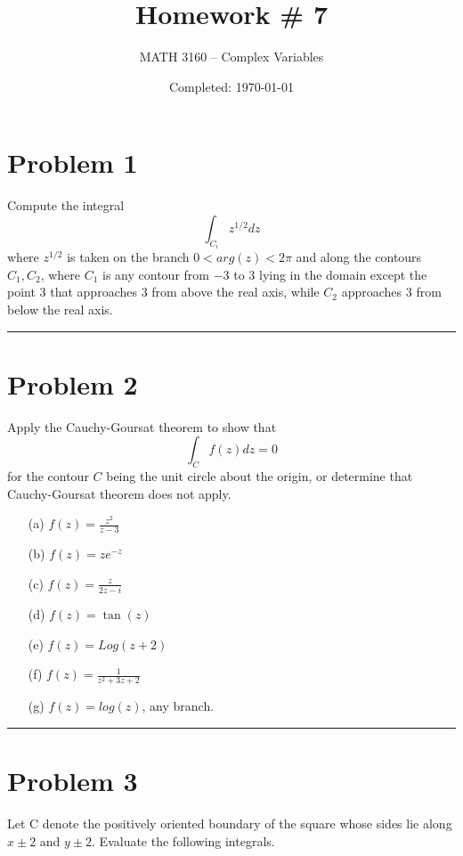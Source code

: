\documentclass{article}
\title{Homework \# 7}
\author{
  MATH 3160 -- Complex Variables\\
  \myauthor
}
\date{Completed: \today}
\begin{document}
\maketitle %


\section*{Problem 1}
Compute the integral \[ \int_{C_i} z^{1/2} dz\] where $ z^{1/2} $ is taken on the branch $0<arg(z)<2\pi$ and along the contours $C_1 , C_2$,  where $C_1$ is any contour from $-3$ to $3$ lying in the domain except the point $3$ that approaches $3$ from above the real axis, while $C_2$ approaches $3$ from below the real axis.
               
\vspace{.5cm} %

\hrule %

\newpage
\section*{Problem 2}
Apply the Cauchy-Goursat theorem to show that \[  \int_C f(z)dz = 0\] for the contour $C$ being the unit circle about the origin, or determine that Cauchy-Goursat theorem does not apply.

\begin{enumerate}
\item[(a)] $f(z) = \frac{z^2}{z-3}$
\item[(b)] $f(z) = ze^{-z}$
\item[(c)] $f(z) = \frac{z}{2z-i}$ 
\item[(d)] $f(z) = \tan(z)$
\item[(e)] $f(z) = Log(z+2)$ 
\item[(f)] $f(z) = \frac{1}{z^2+3z+2}$
\item[(g)] $f(z) = log(z)$, any branch.
\end{enumerate}
		
\vspace{.5cm} %

\hrule

\newpage
\section*{Problem 3}
 Let C denote the positively oriented boundary of the square whose sides lie along $x\pm2$ and $y\pm2$. Evaluate the following integrals.
 
\end{document}
